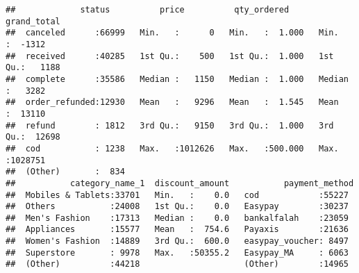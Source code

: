 \documentclass[
]{article}
\begin{document}
\begin{verbatim}
##             status          price          qty_ordered       grand_total     
##  canceled      :66999   Min.   :      0   Min.   :  1.000   Min.   :  -1312  
##  received      :40285   1st Qu.:    500   1st Qu.:  1.000   1st Qu.:   1188  
##  complete      :35586   Median :   1150   Median :  1.000   Median :   3282  
##  order_refunded:12930   Mean   :   9296   Mean   :  1.545   Mean   :  13110  
##  refund        : 1812   3rd Qu.:   9150   3rd Qu.:  1.000   3rd Qu.:  12698  
##  cod           : 1238   Max.   :1012626   Max.   :500.000   Max.   :1028751  
##  (Other)       :  834                                                        
##           category_name_1  discount_amount           payment_method 
##  Mobiles & Tablets:33701   Min.   :    0.0   cod            :55227  
##  Others           :24008   1st Qu.:    0.0   Easypay        :30237  
##  Men's Fashion    :17313   Median :    0.0   bankalfalah    :23059  
##  Appliances       :15577   Mean   :  754.6   Payaxis        :21636  
##  Women's Fashion  :14889   3rd Qu.:  600.0   easypay_voucher: 8497  
##  Superstore       : 9978   Max.   :50355.2   Easypay_MA     : 6063  
##  (Other)          :44218                     (Other)        :14965
\end{verbatim}
\end{document}
